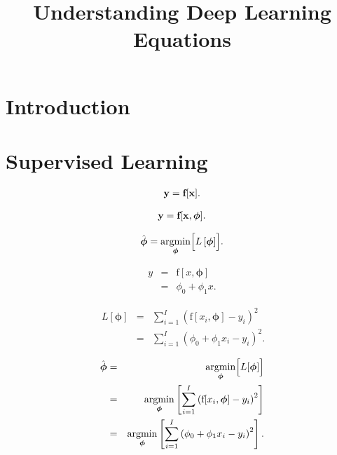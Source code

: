 \documentclass[letterpaper,twoside,openany, titlepage,oldfontcommands,titles,dvipsnames]{memoir}
\title{Understanding Deep Learning Equations}
\begin{document}
\maketitle

\chapter{Introduction}

\chapter{Supervised Learning}


\begin{eqnarray}
  \mathbf{y} = \mbox{\bf f}[\mathbf{x}].
 \end{eqnarray}

\begin{eqnarray}
  \mathbf{y} = \mbox{\bf f}[\mathbf{x}, \boldsymbol\phi].
 \end{eqnarray}

\begin{eqnarray}
  \hat{\boldsymbol\phi} = \mathop{\rm argmin}_{\boldsymbol\phi}\Bigl[L\left[\boldsymbol\phi\right] \Bigr].
 \end{eqnarray}

\begin{eqnarray}\label{eq:sl_linear_regression}
  y &=& \mbox{f}[x,\boldsymbol\phi]\nonumber \\
  &=&\phi_{0}+\phi_{1}x.
 \end{eqnarray}

\begin{eqnarray}\
  L[\boldsymbol\phi] &=& \sum_{i=1}^{I} \left(\mbox{f}[x_{i}, \boldsymbol\phi]-y_{i}\right)^{2}\nonumber \\
  &=& \sum_{i=1}^{I} \left(\phi_{0}+\phi_{1}x_i-y_{i}\right)^{2}.\label{eq:sl_loss_function}
 \end{eqnarray}

\begin{eqnarray}
  \hat{\boldsymbol\phi} &=& \mathop{\rm argmin}_{\boldsymbol\phi}\Bigl[L[\boldsymbol\phi]\Bigr]\nonumber \\
  &=& \mathop{\rm argmin}_{\boldsymbol\phi}\left[\sum_{i=1}^{I} \left(\mbox{f}[x_{i}, \boldsymbol\phi]-y_{i}\right)^{2}\right]\nonumber \\
  &=& \mathop{\rm argmin}_{\boldsymbol\phi}\left[\sum_{i=1}^{I} \left(\phi_{0}+\phi_{1}x_i-y_{i}\right)^{2}\right].
 \end{eqnarray}
\end{document}
